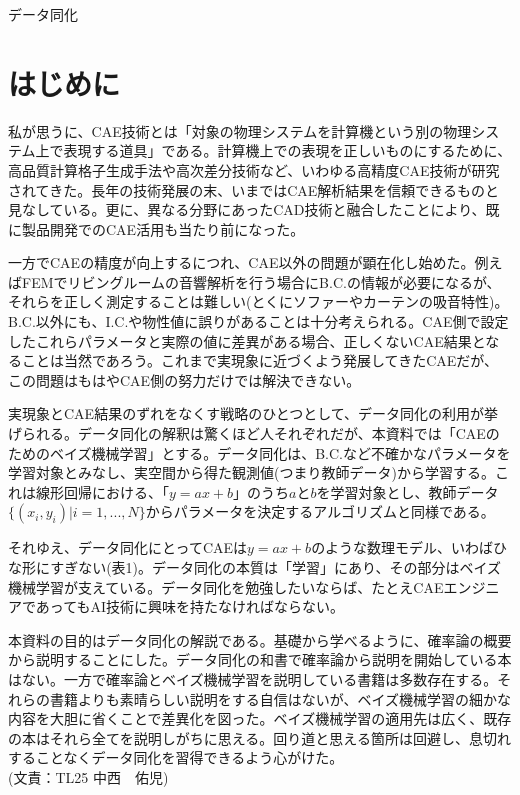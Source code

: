 \documentclass[dvipdfmx, 9pt, a4paper]{jsarticle}
\begin{document}
\begin{center}
{\fontsize{18pt}{1pt}\selectfont データ同化}\\
\end{center}
\section*{はじめに}
私が思うに、CAE技術とは「対象の物理システムを計算機という別の物理システム上で表現する道具」である。計算機上での表現を正しいものにするために、高品質計算格子生成手法や高次差分技術など、いわゆる高精度CAE技術が研究されてきた。長年の技術発展の末、いまではCAE解析結果を信頼できるものと見なしている。更に、異なる分野にあったCAD技術と融合したことにより、既に製品開発でのCAE活用も当たり前になった。\par
一方でCAEの精度が向上するにつれ、CAE以外の問題が顕在化し始めた。例えばFEMでリビングルームの音響解析を行う場合にB.C.の情報が必要になるが、それらを正しく測定することは難しい(とくにソファーやカーテンの吸音特性)。B.C.以外にも、I.C.や物性値に誤りがあることは十分考えられる。CAE側で設定したこれらパラメータと実際の値に差異がある場合、正しくないCAE結果となることは当然であろう。これまで実現象に近づくよう発展してきたCAEだが、この問題はもはやCAE側の努力だけでは解決できない。\par
実現象とCAE結果のずれをなくす戦略のひとつとして、データ同化の利用が挙げられる。データ同化の解釈は驚くほど人それぞれだが、本資料では「CAEのためのベイズ機械学習」とする。データ同化は、B.C.など不確かなパラメータを学習対象とみなし、実空間から得た観測値(つまり教師データ)から学習する。これは線形回帰における、「$y=ax+b$」のうち$a$と$b$を学習対象とし、教師データ$\{ (x_i, y_i)|i=1,...,N \}$からパラメータを決定するアルゴリズムと同様である。\par
それゆえ、データ同化にとってCAEは$y=ax+b$のような数理モデル、いわばひな形にすぎない(表1)。データ同化の本質は「学習」にあり、その部分はベイズ機械学習が支えている。データ同化を勉強したいならば、たとえCAEエンジニアであってもAI技術に興味を持たなければならない。\par
本資料の目的はデータ同化の解説である。基礎から学べるように、確率論の概要から説明することにした。データ同化の和書で確率論から説明を開始している本はない。一方で確率論とベイズ機械学習を説明している書籍は多数存在する。それらの書籍よりも素晴らしい説明をする自信はないが、ベイズ機械学習の細かな内容を大胆に省くことで差異化を図った。ベイズ機械学習の適用先は広く、既存の本はそれら全てを説明しがちに思える。回り道と思える箇所は回避し、息切れすることなくデータ同化を習得できるよう心がけた。\bigskip \\
(文責：TL25 中西　佑児)
\end{document}
